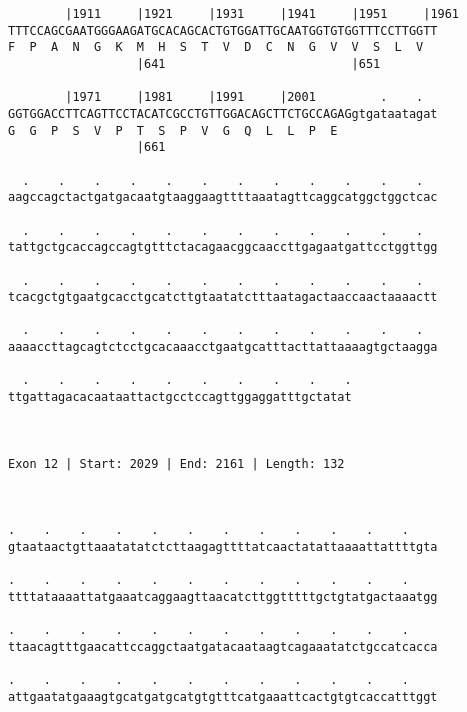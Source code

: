 \documentclass{article}
\begin{document}
\begin{Verbatim}
        |1911     |1921     |1931     |1941     |1951     |1961
TTTCCAGCGAATGGGAAGATGCACAGCACTGTGGATTGCAATGGTGTGGTTTCCTTGGTT
F  P  A  N  G  K  M  H  S  T  V  D  C  N  G  V  V  S  L  V  
                  |641                          |651        
  
        |1971     |1981     |1991     |2001         .    .  
GGTGGACCTTCAGTTCCTACATCGCCTGTTGGACAGCTTCTGCCAGAGgtgataatagat
G  G  P  S  V  P  T  S  P  V  G  Q  L  L  P  E              
                  |661                                      
  
  .    .    .    .    .    .    .    .    .    .    .    .  
aagccagctactgatgacaatgtaaggaagttttaaatagttcaggcatggctggctcac
                                                            
  .    .    .    .    .    .    .    .    .    .    .    .  
tattgctgcaccagccagtgtttctacagaacggcaaccttgagaatgattcctggttgg
                                                            
  .    .    .    .    .    .    .    .    .    .    .    .  
tcacgctgtgaatgcacctgcatcttgtaatatctttaatagactaaccaactaaaactt
                                                            
  .    .    .    .    .    .    .    .    .    .    .    .  
aaaaccttagcagtctcctgcacaaacctgaatgcatttacttattaaaagtgctaagga
                                                            
  .    .    .    .    .    .    .    .    .    .
ttgattagacacaataattactgcctccagttggaggatttgctatat
                                                
                                                
 
Exon 12 | Start: 2029 | End: 2161 | Length: 132



.    .    .    .    .    .    .    .    .    .    .    .    
gtaataactgttaaatatatctcttaagagttttatcaactatattaaaattattttgta
                                                            
.    .    .    .    .    .    .    .    .    .    .    .    
ttttataaaattatgaaatcaggaagttaacatcttggtttttgctgtatgactaaatgg
                                                            
.    .    .    .    .    .    .    .    .    .    .    .    
ttaacagtttgaacattccaggctaatgatacaataagtcagaaatatctgccatcacca
                                                            
.    .    .    .    .    .    .    .    .    .    .    .    
attgaatatgaaagtgcatgatgcatgtgtttcatgaaattcactgtgtcaccatttggt
                                                            

\end{Verbatim}
\end{document}
